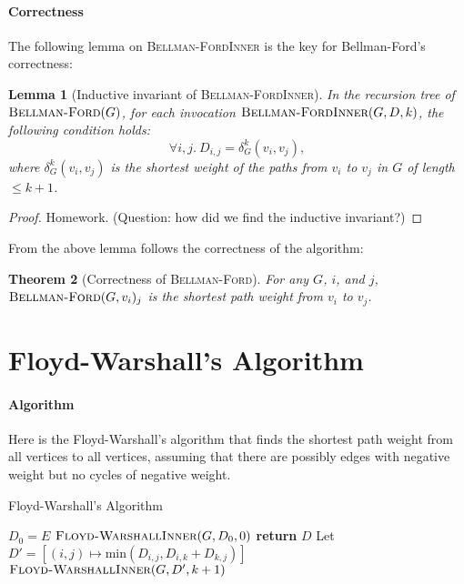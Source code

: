 \documentclass[11pt,a4paper,oneside,microtype,nokorean]{oblivoir}
\newtheorem{theorem}{Theorem}
\newtheorem{lemma}[theorem]{Lemma}
\begin{document}
\paragraph{Correctness} The following lemma on \textsc{Bellman-FordInner} is the key for Bellman-Ford's
correctness:

\begin{lemma}[Inductive invariant of \textsc{Bellman-FordInner}] In the recursion tree of
  $\textsc{Bellman-Ford}(G)$, for each invocation $\textsc{Bellman-FordInner}(G,D,k)$, the
  following condition holds:
  \[ \forall i,j.~D_{i,j} = \delta_G^k(v_i,v_j),
  \]  
  where $\delta_G^k(v_i,v_j)$ is the shortest weight of the paths from $v_i$ to $v_j$ in $G$ of
  length $\le k+1$.
\end{lemma}
\begin{proof}
  Homework.  (Question: how did we find the inductive invariant?)
\end{proof}

From the above lemma follows the correctness of the algorithm:

\begin{theorem}[Correctness of \textsc{Bellman-Ford}] For any $G$, $i$, and $j$,
  $\textsc{Bellman-Ford}(G,v_i)_{j}$ is the shortest path weight from $v_i$ to $v_j$.
\end{theorem}



\section{Floyd-Warshall's Algorithm}

\paragraph{Algorithm}

Here is the Floyd-Warshall's algorithm that finds the shortest path weight from all vertices to all
vertices, assuming that there are possibly edges with negative weight but no cycles of negative
weight.

\begin{algorithm}
  \caption{Floyd-Warshall's Algorithm}\label{dijkstra}
  \begin{algorithmic}[1]
     
    \State $D_0 = E$ 
    \State $\Call{Floyd-WarshallInner}{G,D_0,0}$
    \EndProcedure
    \Statex
     
    \State \textbf{return} $D$
    \EndIf
    \State Let $D' = [(i,j) \mapsto \textrm{min}(D_{i,j}, D_{i,k} + D_{k,j})]$
    \State $\Call{Floyd-WarshallInner}{G,D',k+1}$
    \EndProcedure
  \end{algorithmic}
\end{algorithm}
\end{document}

